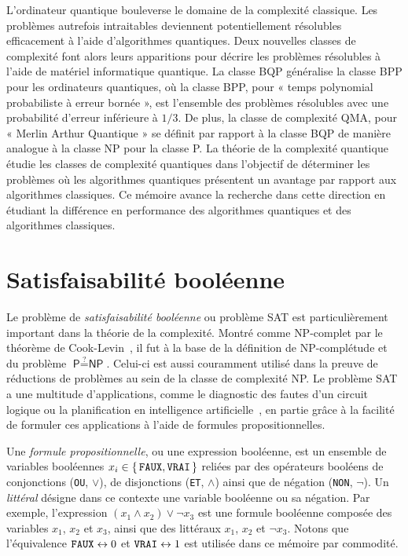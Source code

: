 L'ordinateur quantique bouleverse le domaine de la complexité classique. Les problèmes autrefois intraitables deviennent potentiellement résolubles efficacement à l'aide d'algorithmes quantiques. Deux nouvelles classes de complexité font alors leurs apparitions pour décrire les problèmes résolubles à l'aide de matériel informatique quantique. La classe \textsf{BQP} généralise la classe \textsf{BPP} pour les ordinateurs quantiques, où la classe \textsf{BPP}, pour « temps polynomial probabiliste à erreur bornée », est l'ensemble des problèmes résolubles avec une probabilité d'erreur inférieure à $1/3$. De plus, la classe de complexité \textsf{QMA}, pour « Merlin Arthur Quantique » se définit par rapport à la classe \textsf{BQP} de manière analogue à la classe \textsf{NP} pour la classe \textsf{P}. La théorie de la complexité quantique étudie les classes de complexité quantiques dans l'objectif de déterminer les problèmes où les algorithmes quantiques présentent un avantage par rapport aux algorithmes classiques. Ce mémoire avance la recherche dans cette direction en étudiant la différence en performance des algorithmes quantiques et des algorithmes classiques.


\section{Satisfaisabilité booléenne}
\label{sec:satisfaisabilite-booleenne}

Le problème de \textit{satisfaisabilité booléenne} ou problème SAT est particulièrement important dans la théorie de la complexité. Montré comme \textsf{NP}-complet par le théorème de Cook-Levin~\cite{cookComplexityTheoremprovingProcedures1971,levinUniversalSequentialSearch1973}, il fut à la base de la définition de \textsf{NP}-complétude et du problème $\textsf{P} \stackrel{?}{=} \textsf{NP}$. Celui-ci est aussi couramment utilisé dans la preuve de réductions de problèmes au sein de la classe de complexité \textsf
{NP}. Le problème SAT a une multitude d'applications, comme le diagnostic des fautes d'un circuit logique ou la planification en intelligence artificielle~\cite{marques-silvaPracticalApplicationsBoolean2008}, en partie grâce à la facilité de formuler ces applications à l'aide de formules propositionnelles.

Une \textit{formule propositionnelle}, ou une expression booléenne, est un ensemble de variables booléennes $x_{i} \in \set{\textsc{\texttt{FAUX}}, \textsc{\texttt{VRAI}}}$ reliées par des opérateurs booléens de conjonctions (\textsc{\texttt{OU}}, $\lor$), de disjonctions (\textsc{\texttt{ET}}, $\land$) ainsi que de négation (\textsc{\texttt{NON}}, $\neg$).  Un \textit{littéral} désigne dans ce contexte une variable booléenne ou sa négation. Par exemple, l'expression $(x_{1} \land x_{2}) \lor \neg x_{3}$ est une formule booléenne composée des variables $x_{1}$, $x_{2}$ et $x_{3}$, ainsi que des littéraux $x_{1}$, $x_{2}$ et $\neg x_{3}$. Notons que l'équivalence $\textsc{\texttt{FAUX}} \leftrightarrow 0$ et $\textsc{\texttt{VRAI}} \leftrightarrow 1$ est utilisée dans ce mémoire par commodité.

